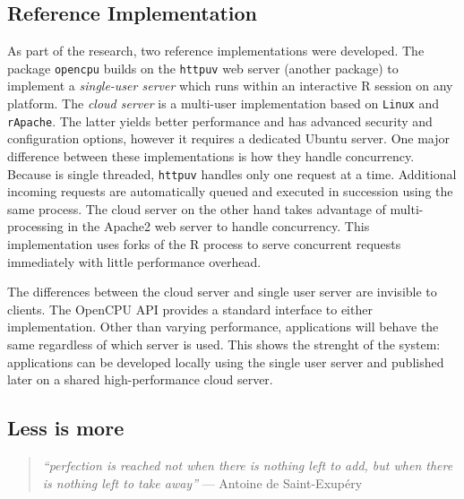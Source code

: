 \subsection{Reference Implementation}

As part of the research, two reference implementations were developed. The \R package \texttt{opencpu} builds on the \texttt{httpuv} web server (another \R package) to implement a \emph{single-user server} which runs within an interactive R session on any platform. The \emph{cloud server} is a multi-user implementation based on \texttt{Linux} and \texttt{rApache}. The latter yields better performance and has advanced security and configuration options, however it requires a dedicated Ubuntu server. One major difference between these implementations is how they handle concurrency. Because \R is single threaded, \texttt{httpuv} handles only one request at a time. Additional incoming requests are automatically queued and executed in succession using the same process. The cloud server on the other hand takes advantage of multi-processing in the Apache2 web server to handle concurrency. This implementation uses forks of the R process to serve concurrent requests immediately with little performance overhead. 

The differences between the cloud server and single user server are invisible to clients. The OpenCPU API provides a standard interface to either implementation. Other than varying performance, applications will behave the same regardless of which server is used. This shows the strenght of the system: applications can be developed locally using the single user server and published later on a shared high-performance cloud server.


\subsection{Less is more}

\begin{quote}
\emph{``perfection is reached not when there is nothing left to add, but when there is nothing left to take away''} --- Antoine de Saint-Exupéry
\end{quote}

\vspace{8pt}


